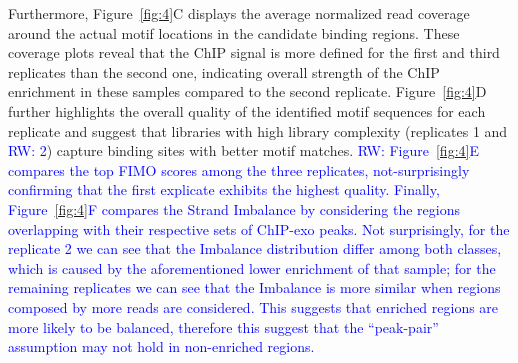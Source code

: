 \documentclass{bmcart}
\newcommand{\SK}[1]{\textcolor{red}{SK: #1}}
\newcommand{\RW}[1]{\textcolor{blue}{RW: #1}}
\begin{document}
Furthermore, Figure~\ref{fig:4}C displays the average normalized
read coverage around the actual motif locations in the candidate
binding regions.  These coverage plots reveal that the ChIP signal is
more defined for the first and third replicates than the second one,
indicating overall strength of the ChIP enrichment in these samples
compared to the second replicate.
Figure~\ref{fig:4}D further highlights the overall quality of the
identified motif sequences for each replicate and suggest that
libraries with high library complexity (replicates 1 and \RW{2})
capture binding sites with better motif
matches. \RW{Figure~\ref{fig:4}E compares the top FIMO scores among
  the three replicates, not-surprisingly confirming that the first
  explicate exhibits the highest quality. Finally, Figure~\ref{fig:4}F
  compares the Strand Imbalance by considering the regions overlapping
  with their respective sets of ChIP-exo peaks. Not surprisingly, for
  the replicate 2 we can see that the Imbalance distribution differ
  among both classes, which is caused by the aforementioned lower
  enrichment of that sample; for the remaining replicates we can see
  that the Imbalance is more similar when regions composed by more
  reads are considered. This suggests that enriched regions are more
  likely to be balanced, therefore this suggest that the ``peak-pair''
  assumption may not hold in non-enriched regions.}

\end{document}

